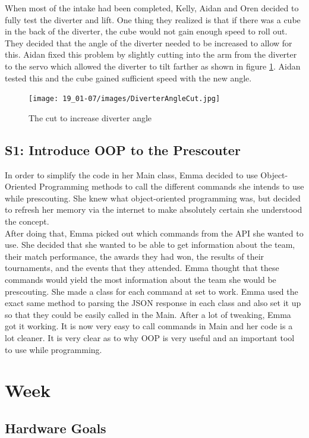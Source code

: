 \documentclass{article}
\begin{document}
When most of the intake had been completed, Kelly, Aidan and Oren decided to fully test the diverter and lift. One thing they realized is that if there was a cube in the back of the diverter, the cube would not gain enough speed to roll out. They decided that the angle of the diverter needed to be increased to allow for this. Aidan fixed this problem by slightly cutting into the arm from the diverter to the servo which allowed the diverter to tilt farther as shown in figure \ref{fig:Cutout}. Aidan tested this and the cube gained sufficient speed with the new angle.

\begin{figure}
    \centering
    \texttt{[image: 19\_01-07/images/DiverterAngleCut.jpg]}
    \caption{The cut to increase diverter angle}
    \label{fig:Cutout}
\end{figure}
\subsection{S1: Introduce OOP to the Prescouter}

In order to simplify the code in her Main class, Emma decided to use Object-Oriented Programming methods to call the different commands she intends to use while prescouting. She knew what object-oriented programming was, but decided to refresh her memory via the internet to make absolutely certain she understood the concept. \\

After doing that, Emma picked out which commands from the API she wanted to use. She decided that she wanted to be able to get information about the team, their match performance, the awards they had won, the results of their tournaments, and the events that they attended. Emma thought that these commands would yield the most information about the team she would be prescouting. She made a class for each command at set to work. Emma used the exact same method to parsing the JSON response in each class and also set it up so that they could be easily called in the Main. After a lot of tweaking, Emma got it working. It is now very easy to call commands in Main and her code is a lot cleaner. It is very clear as to why OOP is very useful and an important tool to use while programming. 
\clearpage \newpage \section{Week \thesection} 
\subsection{Hardware Goals}
\end{document}
